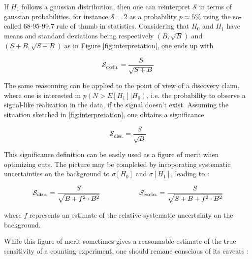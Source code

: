     If $H_1$ follows a gaussian distribution, then one can reinterpret $\mathcal{S}$ in terms
    of gaussian probabilities, for instance $\mathcal{S} = 2$ as a probability $p\approx5\%$
    using the so-called 68-95-99.7 rule of thumb in statistics. Considering that $H_0$ and
    $H_1$ have means and standard deviations being respectively $(B,\sqrt{B})$ and
    $(S+B,\sqrt{S+B})$ as in Figure \ref{fig:interpretation}, one ends up with

    $$ \mathcal{S}_\text{exclu.} = \frac{S}{\sqrt{S+B}}$$

    The same reasonning can be applied to the point of view of a discovery claim, where
    one is interested in $p(N > E[H_1]|H_0)$, i.e. the probability to observe a
    signal-like realization in the data, if the signal doesn't exist. Assuming the situation
    sketched in \ref{fig:interpretation}, one obtains a significance

    $$ \mathcal{S}_\text{disc.} = \frac{S}{\sqrt{B}}$$

    This significance definition can be easily used as a figure of merit when optimizing
    cuts. The picture may be completed by incoporating systematic uncertainties on the
    background to $\sigma[H_0]$ and $\sigma[H_1]$, leading to :

    \begin{equation}
       \mathcal{S}_\text{disc.} = \frac{S}{\sqrt{B+f^2 \cdot B^2}}
       \hspace*{2cm}
       \mathcal{S}_\text{exclu.} = \frac{S}{\sqrt{S+B+f^2 \cdot B^2}}
       \label{FoM}
   \end{equation}

    where $f$ represents an estimate of the relative systematic uncertainty on the background.

    While this figure of merit sometimes gives a reasonnable estimate of the true
    sensitivity of a counting experiment, one should remane conscious of its caveats
    \cite{Punzi} :

